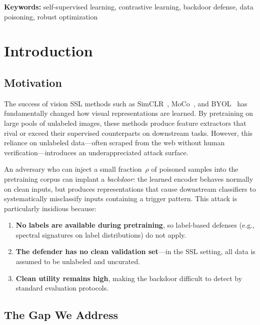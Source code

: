 \documentclass[11pt,a4paper]{article}
\begin{document}
\textbf{Keywords:} self-supervised learning, contrastive learning, backdoor
defense, data poisoning, robust optimization

\tableofcontents
\newpage

\section{Introduction}
\label{sec:intro}

\subsection{Motivation}

The success of vision SSL methods such as SimCLR~\cite{chen2020simclr},
MoCo~\cite{he2020moco}, and BYOL~\cite{grill2020byol} has fundamentally changed
how visual representations are learned.  By pretraining on large pools of
unlabeled images, these methods produce feature extractors that rival or exceed
their supervised counterparts on downstream tasks.  However, this reliance on
unlabeled data---often scraped from the web without human
verification---introduces an underappreciated attack surface.

An adversary who can inject a small fraction~$\rho$ of poisoned samples into the
pretraining corpus can implant a \emph{backdoor}: the learned encoder behaves
normally on clean inputs, but produces representations that cause downstream
classifiers to systematically misclassify inputs containing a trigger pattern.
This attack is particularly insidious because:
\begin{enumerate}[nosep]
  \item \textbf{No labels are available during pretraining}, so label-based
    defenses (e.g., spectral signatures on label distributions) do not apply.
  \item \textbf{The defender has no clean validation set}---in the SSL setting,
    all data is assumed to be unlabeled and uncurated.
  \item \textbf{Clean utility remains high}, making the backdoor difficult to
    detect by standard evaluation protocols.
\end{enumerate}

\subsection{The Gap We Address}
\end{document}
